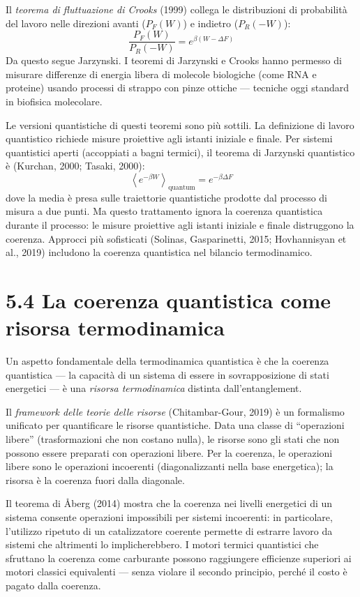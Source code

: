 \documentclass[11.5pt,a4paper,openany]{book}
\theoremstyle{remark}
\begin{document}
Il \textit{teorema di fluttuazione di Crooks} (1999) collega le distribuzioni di probabilità del lavoro nelle direzioni avanti ($P_F(W)$) e indietro ($P_R(-W)$):
\[
\frac{P_F(W)}{P_R(-W)} = e^{\beta(W - \Delta F)}
\]
Da questo segue Jarzynski. I teoremi di Jarzynski e Crooks hanno permesso di misurare differenze di energia libera di molecole biologiche (come RNA e proteine) usando processi di strappo con pinze ottiche --- tecniche oggi standard in biofisica molecolare.

Le versioni quantistiche di questi teoremi sono più sottili. La definizione di lavoro quantistico richiede misure proiettive agli istanti iniziale e finale. Per sistemi quantistici aperti (accoppiati a bagni termici), il teorema di Jarzynski quantistico è (Kurchan, 2000; Tasaki, 2000):
\[
\left\langle e^{-\beta W} \right\rangle_{\text{quantum}} = e^{-\beta \Delta F}
\]
dove la media è presa sulle traiettorie quantistiche prodotte dal processo di misura a due punti. Ma questo trattamento ignora la coerenza quantistica durante il processo: le misure proiettive agli istanti iniziale e finale distruggono la coerenza. Approcci più sofisticati (Solinas, Gasparinetti, 2015; Hovhannisyan et al., 2019) includono la coerenza quantistica nel bilancio termodinamico.

\section{5.4 La coerenza quantistica come risorsa termodinamica}

Un aspetto fondamentale della termodinamica quantistica è che la coerenza quantistica --- la capacità di un sistema di essere in sovrapposizione di stati energetici --- è una \textit{risorsa termodinamica} distinta dall'entanglement.

Il \textit{framework delle teorie delle risorse} (Chitambar-Gour, 2019) è un formalismo unificato per quantificare le risorse quantistiche. Data una classe di ``operazioni libere'' (trasformazioni che non costano nulla), le risorse sono gli stati che non possono essere preparati con operazioni libere. Per la coerenza, le operazioni libere sono le operazioni incoerenti (diagonalizzanti nella base energetica); la risorsa è la coerenza fuori dalla diagonale.

Il teorema di Åberg (2014) mostra che la coerenza nei livelli energetici di un sistema consente operazioni impossibili per sistemi incoerenti: in particolare, l'utilizzo ripetuto di un catalizzatore coerente permette di estrarre lavoro da sistemi che altrimenti lo implicherebbero. I motori termici quantistici che sfruttano la coerenza come carburante possono raggiungere efficienze superiori ai motori classici equivalenti --- senza violare il secondo principio, perché il costo è pagato dalla coerenza.
\end{document}
